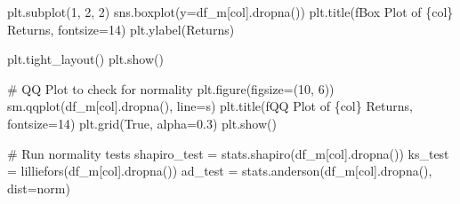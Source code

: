 \documentclass[
  letterpaper,
  DIV=11,
  numbers=noendperiod]{scrartcl}
\newenvironment{Shaded}{\begin{snugshade}}{\end{snugshade}}
\newcommand{\CommentTok}[1]{\textcolor[rgb]{0.37,0.37,0.37}{#1}}
\newcommand{\DecValTok}[1]{\textcolor[rgb]{0.68,0.00,0.00}{#1}}
\newcommand{\FloatTok}[1]{\textcolor[rgb]{0.68,0.00,0.00}{#1}}
\newcommand{\NormalTok}[1]{\textcolor[rgb]{0.00,0.23,0.31}{#1}}
\newcommand{\OperatorTok}[1]{\textcolor[rgb]{0.37,0.37,0.37}{#1}}
\newcommand{\SpecialCharTok}[1]{\textcolor[rgb]{0.37,0.37,0.37}{#1}}
\newcommand{\SpecialStringTok}[1]{\textcolor[rgb]{0.13,0.47,0.30}{#1}}
\newcommand{\StringTok}[1]{\textcolor[rgb]{0.13,0.47,0.30}{#1}}
\newcommand{\VariableTok}[1]{\textcolor[rgb]{0.07,0.07,0.07}{#1}}
\begin{document}
\begin{Shaded}
\begin{Highlighting}[]
\NormalTok{    plt.subplot(}\DecValTok{1}\NormalTok{, }\DecValTok{2}\NormalTok{, }\DecValTok{2}\NormalTok{)}
\NormalTok{    sns.boxplot(y}\OperatorTok{=}\NormalTok{df\_m[col].dropna())}
\NormalTok{    plt.title(}\SpecialStringTok{f\textquotesingle{}Box Plot of }\SpecialCharTok{\{}\NormalTok{col}\SpecialCharTok{\}}\SpecialStringTok{ Returns\textquotesingle{}}\NormalTok{, fontsize}\OperatorTok{=}\DecValTok{14}\NormalTok{)}
\NormalTok{    plt.ylabel(}\StringTok{\textquotesingle{}Returns\textquotesingle{}}\NormalTok{)}

\NormalTok{    plt.tight\_layout()}
\NormalTok{    plt.show()}

    \CommentTok{\# QQ Plot to check for normality}
\NormalTok{    plt.figure(figsize}\OperatorTok{=}\NormalTok{(}\DecValTok{10}\NormalTok{, }\DecValTok{6}\NormalTok{))}
\NormalTok{    sm.qqplot(df\_m[col].dropna(), line}\OperatorTok{=}\StringTok{\textquotesingle{}s\textquotesingle{}}\NormalTok{)}
\NormalTok{    plt.title(}\SpecialStringTok{f\textquotesingle{}QQ Plot of }\SpecialCharTok{\{}\NormalTok{col}\SpecialCharTok{\}}\SpecialStringTok{ Returns\textquotesingle{}}\NormalTok{, fontsize}\OperatorTok{=}\DecValTok{14}\NormalTok{)}
\NormalTok{    plt.grid(}\VariableTok{True}\NormalTok{, alpha}\OperatorTok{=}\FloatTok{0.3}\NormalTok{)}
\NormalTok{    plt.show()}

    \CommentTok{\# Run normality tests}
\NormalTok{    shapiro\_test }\OperatorTok{=}\NormalTok{ stats.shapiro(df\_m[col].dropna())}
\NormalTok{    ks\_test }\OperatorTok{=}\NormalTok{ lilliefors(df\_m[col].dropna())}
\NormalTok{    ad\_test }\OperatorTok{=}\NormalTok{ stats.anderson(df\_m[col].dropna(), dist}\OperatorTok{=}\StringTok{\textquotesingle{}norm\textquotesingle{}}\NormalTok{)}


\end{Highlighting}
\end{Shaded}
\end{document}
